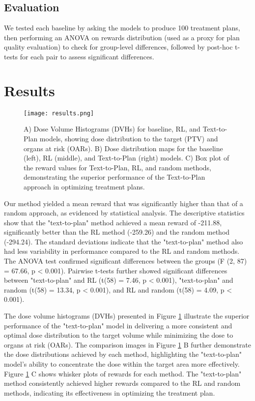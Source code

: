 \documentclass[runningheads]{llncs}
\begin{document}
\subsection{Evaluation}

We tested each baseline by asking the models to produce 100 treatment plans, then performing an ANOVA on rewards distribution (used as a proxy for plan quality evaluation) to check for group-level differences, followed by post-hoc t-tests for each pair to assess significant differences.

\section{Results}

\begin{figure}
    \centering
    \texttt{[image: results.png]}
    \caption{A) Dose Volume Histograms (DVHs) for baseline, RL, and Text-to-Plan models, showing dose distribution to the target (PTV) and organs at risk (OARs).
B) Dose distribution maps for the baseline (left), RL (middle), and Text-to-Plan (right) models.
C) Box plot of the reward values for Text-to-Plan, RL, and random methods, demonstrating the superior performance of the Text-to-Plan approach in optimizing treatment plans.}
    \label{fig:results_comparison}
\end{figure}


Our method yielded a mean reward that was significantly higher than that of a random approach, as evidenced by statistical analysis. The descriptive statistics show that the "text-to-plan" method achieved a mean reward of -211.88, significantly better than the RL method (-259.26) and the random method (-294.24). The standard deviations indicate that the "text-to-plan" method also had less variability in performance compared to the RL and random methods. The ANOVA test confirmed significant differences between the groups (F (2, 87) = 67.66, p < 0.001). Pairwise t-tests further showed significant differences between "text-to-plan" and RL (t(58) = 7.46, p < 0.001), "text-to-plan" and random (t(58) = 13.34, p < 0.001), and RL and random (t(58) = 4.09, p < 0.001).

The dose volume histograms (DVHs) presented in Figure \ref{fig:results_comparison} illustrate the superior performance of the "text-to-plan" model in delivering a more consistent and optimal dose distribution to the target volume while minimizing the dose to organs at risk (OARs). The comparison images in Figure \ref{fig:results_comparison} B further demonstrate the dose distributions achieved by each method, highlighting the "text-to-plan" model's ability to concentrate the dose within the target area more effectively. Figure \ref{fig:results_comparison} C shows whisker plots of rewards for each method. The "text-to-plan" method consistently achieved higher rewards compared to the RL and random methods, indicating its effectiveness in optimizing the treatment plan.
\end{document}
